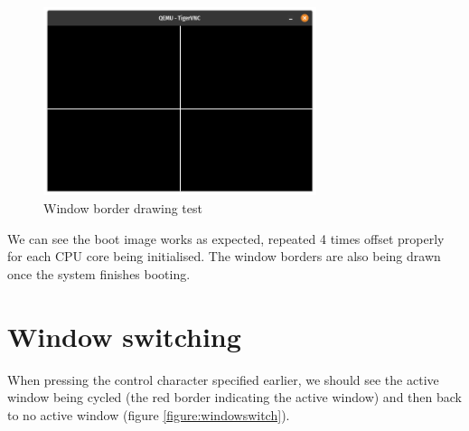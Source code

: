 \begin{figure}[H]
    \centering
    \includegraphics[width=8cm]{active0.png}
    \caption{Window border drawing test}
    \label{figure:winborder}
\end{figure}

We can see the boot image works as expected, repeated 4 times offset properly
for each CPU core being initialised. The window borders are also being drawn
once the system finishes booting.  

\section{Window switching}

When pressing the control character specified earlier, we should see the active
window being cycled (the red border indicating the active window) and then back to no
active window (figure \ref{figure:windowswitch}). 

